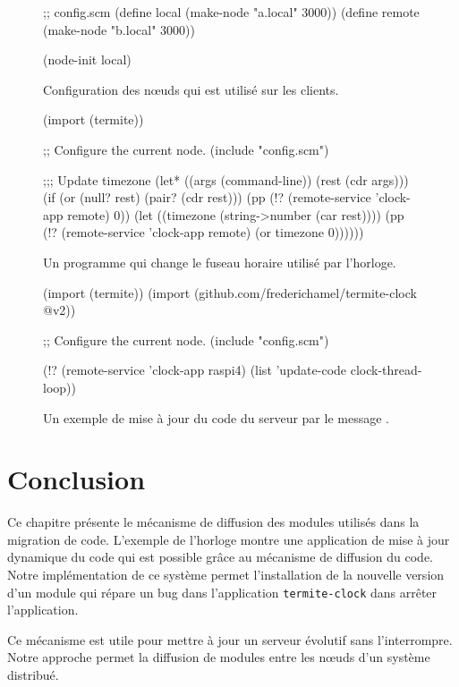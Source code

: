 \begin{figure}[h!]
\begin{center}
\begin{mplisting}{1}
;; config.scm
(define local (make-node "a.local" 3000))
(define remote (make-node "b.local" 3000))

(node-init local)
\end{mplisting}
\end{center}
  \caption{Configuration des nœuds qui est utilisé sur les clients.}
  \vspace*{4ex}
\end{figure}

\begin{figure}[h!]
\begin{center}
\begin{mplisting}{1}
(import (termite))

;; Configure the current node.
(include "config.scm")

;;; Update timezone
(let* ((args (command-line))
       (rest (cdr args)))
  (if (or (null? rest)
          (pair? (cdr rest)))
      (pp (!? (remote-service 'clock-app remote) 0))
      (let ((timezone (string->number (car rest))))
        (pp (!? (remote-service 'clock-app remote) (or timezone 0))))))
\end{mplisting}
\end{center}
  \caption{Un programme qui change le fuseau horaire utilisé par
    l'horloge.}
  \vspace*{4ex}
\end{figure}

\begin{figure}[h!]
\begin{center}
\begin{mplisting}{1}
(import (termite))
(import (github.com/frederichamel/termite-clock @v2))

;; Configure the current node.
(include "config.scm")

(!? (remote-service 'clock-app raspi4)
    (list 'update-code clock-thread-loop))
\end{mplisting}
\end{center}
  \caption{Un exemple de mise à jour du code du serveur
    par le message .}
  \vspace*{4ex}
\end{figure}

\section{Conclusion}
Ce chapitre présente le mécanisme de diffusion des modules utilisés
dans la migration de code. L'exemple de l'horloge montre une application
de mise à jour dynamique du code qui est possible grâce au mécanisme
de diffusion du code. Notre implémentation de ce système permet l'installation
de la nouvelle version d'un module qui répare un bug dans l'application
\texttt{termite-clock} dans arrêter l'application.

Ce mécanisme est utile pour mettre à jour un serveur évolutif
sans l'interrompre. Notre approche permet la diffusion de modules
entre les nœuds d'un système distribué.

